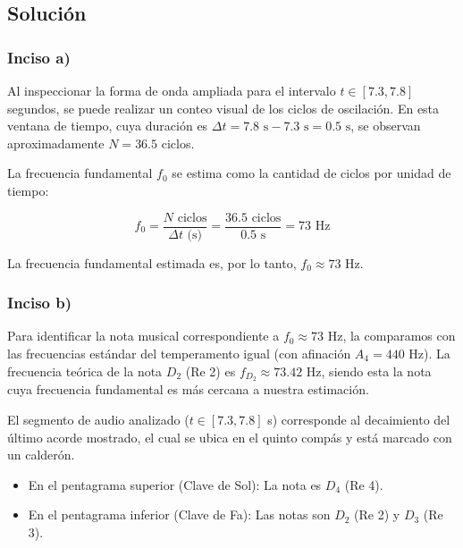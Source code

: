 \documentclass[paper=letter, fontsize=11pt, draft=false]{scrartcl}
\numberwithin{equation}{problemcounter} %
\numberwithin{figure}{problemcounter} %
\numberwithin{table}{problemcounter} %
\numberwithin{subsection}{problemcounter}
\begin{document}
\subsection{Solución}

\subsubsection{Inciso a)}

Al inspeccionar la forma de onda ampliada para el intervalo $t \in [7.3, 7.8]$ segundos, se puede realizar un conteo visual de los ciclos de oscilación. En esta ventana de tiempo, cuya duración es $\Delta t = 7.8 \text{ s} - 7.3 \text{ s} = 0.5 \text{ s}$, se observan aproximadamente $N = 36.5$ ciclos.

La frecuencia fundamental $f_0$ se estima como la cantidad de ciclos por unidad de tiempo:

\begin{equation}
    f_0 = \frac{N \text{ ciclos}}{\Delta t \text{ (s)}} = \frac{36.5 \text{ ciclos}}{0.5 \text{ s}} = 73 \text{ Hz}
\end{equation}

La frecuencia fundamental estimada es, por lo tanto, $f_0 \approx 73 \text{ Hz}$.

\subsubsection{Inciso b)}

Para identificar la nota musical correspondiente a $f_0 \approx 73 \text{ Hz}$, la comparamos con las frecuencias estándar del temperamento igual (con afinación $A_4 = 440 \text{ Hz}$). La frecuencia teórica de la nota $D_2$ (Re 2) es $f_{D_2} \approx 73.42 \text{ Hz}$, siendo esta la nota cuya frecuencia fundamental es más cercana a nuestra estimación.

El segmento de audio analizado ($t \in [7.3, 7.8]$ s) corresponde al decaimiento del último acorde mostrado, el cual se ubica en el quinto compás y está marcado con un calderón.

\begin{itemize}

\item En el pentagrama superior (Clave de Sol): La nota es $D_4$ (Re 4).

\item En el pentagrama inferior (Clave de Fa): Las notas son $D_2$ (Re 2) y $D_3$ (Re 3).

\end{itemize}
\end{document}
